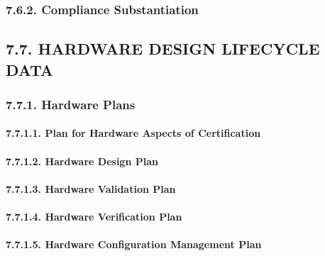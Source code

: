 \documentclass[
]{article}
\begin{document}
\hypertarget{compliance-substantiation-1}{%
\subsubsection{7.6.2. Compliance
Substantiation}\label{compliance-substantiation-1}}

\hypertarget{hardware-design-lifecycle-data-1}{%
\subsection{7.7. HARDWARE DESIGN LIFECYCLE
DATA}\label{hardware-design-lifecycle-data-1}}

\hypertarget{hardware-plans-1}{%
\subsubsection{7.7.1. Hardware Plans}\label{hardware-plans-1}}

\hypertarget{plan-for-hardware-aspects-of-certification-1}{%
\paragraph{7.7.1.1. Plan for Hardware Aspects of
Certification}\label{plan-for-hardware-aspects-of-certification-1}}

\hypertarget{hardware-design-plan-1}{%
\paragraph{7.7.1.2. Hardware Design Plan}\label{hardware-design-plan-1}}

\hypertarget{hardware-validation-plan-1}{%
\paragraph{7.7.1.3. Hardware Validation
Plan}\label{hardware-validation-plan-1}}

\hypertarget{hardware-verification-plan-1}{%
\paragraph{7.7.1.4. Hardware Verification
Plan}\label{hardware-verification-plan-1}}

\hypertarget{hardware-configuration-management-plan-1}{%
\paragraph{7.7.1.5. Hardware Configuration Management
Plan}\label{hardware-configuration-management-plan-1}}
\end{document}
